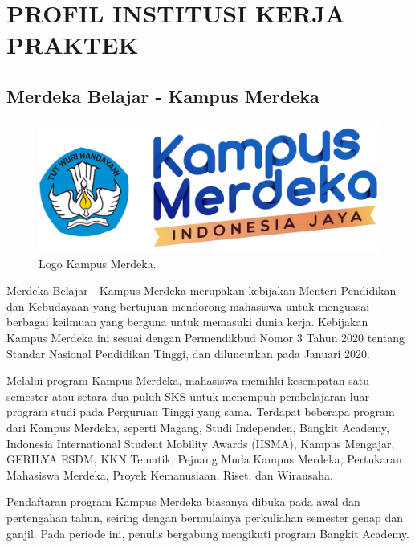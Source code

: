 \chapter{PROFIL INSTITUSI KERJA PRAKTEK}
\section{Merdeka Belajar - Kampus Merdeka}
\begin{figure}[H]
	\centering
	\includegraphics[scale=0.25]{./assets/logombkm}
	\caption{Logo Kampus Merdeka.}
\end{figure}
Merdeka Belajar - Kampus Merdeka merupakan kebijakan Menteri Pendidikan dan Kebudayaan yang bertujuan mendorong mahasiswa untuk menguasai berbagai keilmuan yang berguna untuk memasuki dunia kerja. Kebijakan Kampus Merdeka ini sesuai dengan Permendikbud Nomor 3 Tahun 2020 tentang Standar Nasional Pendidikan Tinggi, dan diluncurkan pada Januari 2020.

Melalui program Kampus Merdeka, mahasiswa memiliki kesempatan satu semester atau setara dua puluh SKS untuk menempuh pembelajaran luar program studi pada Perguruan Tinggi yang sama. Terdapat beberapa program dari Kampus Merdeka, seperti Magang, Studi Independen, Bangkit Academy, Indonesia International Student Mobility Awards (IISMA), Kampus Mengajar, GERILYA ESDM, KKN Tematik, Pejuang Muda Kampus Merdeka, Pertukaran Mahasiswa Merdeka, Proyek Kemanusiaan, Riset, dan Wirausaha.

Pendaftaran program Kampus Merdeka biasanya dibuka pada awal dan pertengahan tahun, seiring dengan bermulainya perkuliahan semester genap dan ganjil. Pada periode ini, penulis bergabung mengikuti program Bangkit Academy.

